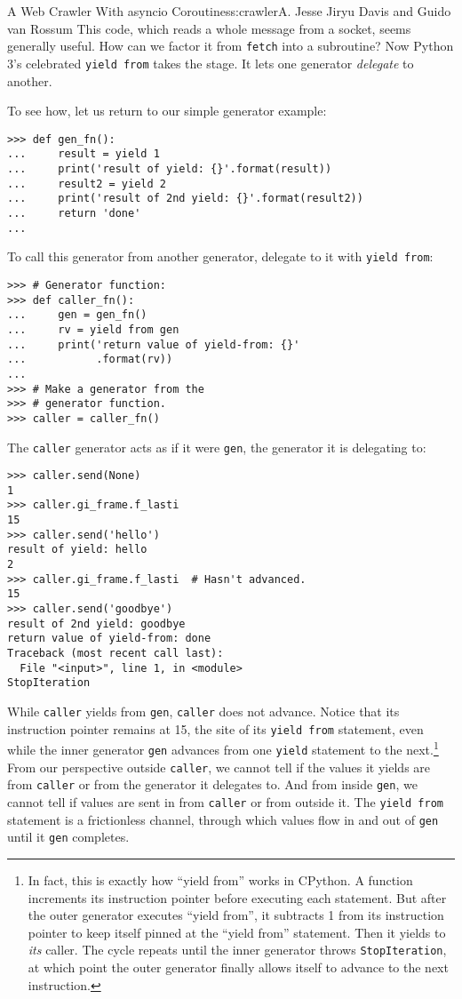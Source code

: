 \begin{aosachapter}{A Web Crawler With asyncio Coroutines}{s:crawler}{A. Jesse Jiryu Davis and Guido van Rossum}
This code, which reads a whole message from a socket, seems generally
useful. How can we factor it from \texttt{fetch} into a subroutine? Now
Python 3's celebrated \texttt{yield from} takes the stage. It lets one
generator \emph{delegate} to another.

To see how, let us return to our simple generator example:

\begin{verbatim}
>>> def gen_fn():
...     result = yield 1
...     print('result of yield: {}'.format(result))
...     result2 = yield 2
...     print('result of 2nd yield: {}'.format(result2))
...     return 'done'
...     
\end{verbatim}

To call this generator from another generator, delegate to it with
\texttt{yield from}:

\begin{verbatim}
>>> # Generator function:
>>> def caller_fn():
...     gen = gen_fn()
...     rv = yield from gen
...     print('return value of yield-from: {}'
...           .format(rv))
...
>>> # Make a generator from the
>>> # generator function.
>>> caller = caller_fn()
\end{verbatim}

The \texttt{caller} generator acts as if it were \texttt{gen}, the
generator it is delegating to:

\begin{verbatim}
>>> caller.send(None)
1
>>> caller.gi_frame.f_lasti
15
>>> caller.send('hello')
result of yield: hello
2
>>> caller.gi_frame.f_lasti  # Hasn't advanced.
15
>>> caller.send('goodbye')
result of 2nd yield: goodbye
return value of yield-from: done
Traceback (most recent call last):
  File "<input>", line 1, in <module>
StopIteration
\end{verbatim}

While \texttt{caller} yields from \texttt{gen}, \texttt{caller} does not
advance. Notice that its instruction pointer remains at 15, the site of
its \texttt{yield from} statement, even while the inner generator
\texttt{gen} advances from one \texttt{yield} statement to the
next.\footnote{In fact, this is exactly how ``yield from'' works in
  CPython. A function increments its instruction pointer before
  executing each statement. But after the outer generator executes
  ``yield from'', it subtracts 1 from its instruction pointer to keep
  itself pinned at the ``yield from'' statement. Then it yields to
  \emph{its} caller. The cycle repeats until the inner generator throws
  \texttt{StopIteration}, at which point the outer generator finally
  allows itself to advance to the next instruction.} From our
perspective outside \texttt{caller}, we cannot tell if the values it
yields are from \texttt{caller} or from the generator it delegates to.
And from inside \texttt{gen}, we cannot tell if values are sent in from
\texttt{caller} or from outside it. The \texttt{yield from} statement is
a frictionless channel, through which values flow in and out of
\texttt{gen} until it \texttt{gen} completes.


\end{aosachapter}
